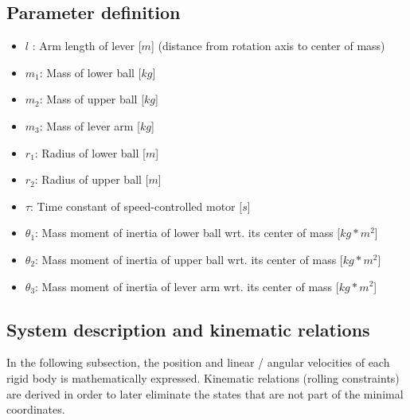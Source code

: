\documentclass{article}
\begin{document}
\subsection{Parameter definition}
\begin{itemize}
	\item $l$ : Arm length of lever [$m$] (distance from rotation axis to center of mass)
	\item $m_1$: Mass of lower ball [$kg$]
	\item $m_2$: Mass of upper ball [$kg$]
	\item $m_3$: Mass of lever arm [$kg$]
	\item $r_1$: Radius of lower ball [$m$]
	\item $r_2$: Radius of upper ball [$m$]
	\item $\tau$: Time constant of speed-controlled motor [$s$]
	\item $\theta_1$: Mass moment of inertia of lower ball wrt. its center of mass [$kg*m^2$]
	\item $\theta_2$: Mass moment of inertia of upper ball wrt. its center of mass [$kg*m^2$]
	\item $\theta_3$: Mass moment of inertia of lever arm wrt. its center of mass [$kg*m^2$]
	\end{itemize}

\subsection{System description and kinematic relations}
In the following subsection, the position and linear / angular velocities of each rigid body is mathematically expressed. Kinematic relations (rolling constraints) are derived in order to later eliminate the states that are not part of the minimal coordinates.
\end{document}
